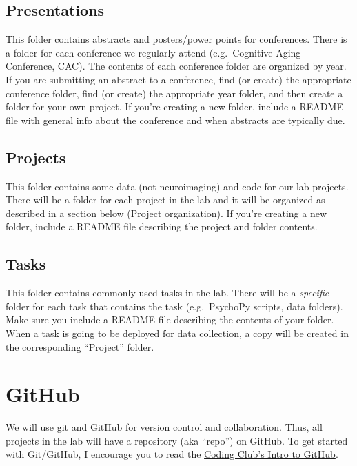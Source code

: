 \documentclass[
]{book}
\begin{document}
\hypertarget{presentations}{%
\subsection{Presentations}\label{presentations}}

This folder contains abstracts and posters/power points for conferences. There is a folder for each conference we regularly attend (e.g.~Cognitive Aging Conference, CAC). The contents of each conference folder are organized by year. If you are submitting an abstract to a conference, find (or create) the appropriate conference folder, find (or create) the appropriate year folder, and then create a folder for your own project. If you're creating a new folder, include a README file with general info about the conference and when abstracts are typically due.

\hypertarget{projects}{%
\subsection{Projects}\label{projects}}

This folder contains some data (not neuroimaging) and code for our lab projects. There will be a folder for each project in the lab and it will be organized as described in a section below (Project organization). If you're creating a new folder, include a README file describing the project and folder contents.

\hypertarget{tasks}{%
\subsection{Tasks}\label{tasks}}

This folder contains commonly used tasks in the lab. There will be a \emph{specific} folder for each task that contains the task (e.g.~PsychoPy scripts, data folders). Make sure you include a README file describing the contents of your folder. When a task is going to be deployed for data collection, a copy will be created in the corresponding ``Project'' folder.

\hypertarget{github}{%
\section{GitHub}\label{github}}

We will use git and GitHub for version control and collaboration. Thus, all projects in the lab will have a repository (aka ``repo'') on GitHub. To get started with Git/GitHub, I encourage you to read the \href{https://ourcodingclub.github.io/2017/02/27/git.html}{Coding Club's Intro to GitHub}.
\end{document}
